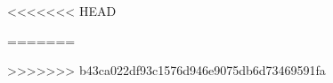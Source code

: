 \documentclass[mpca]{unb-cic}
\begin{document}
\renewcommand{\appendixname}{Anexo}


  \textual

  
  
  
  
<<<<<<< HEAD
  
   
=======
  
>>>>>>> b43ca022df93c1576d946e9075db6d73469591fa


 \postextual
 
  
%  
\end{document}
